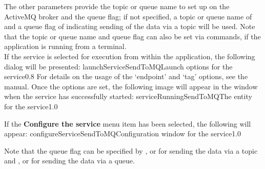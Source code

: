 The other parameters provide the topic or queue name to set up on the ActiveMQ broker and
the queue flag; if not specified, a topic or queue name of  and a queue flag
of  \longDash{} indicating sending of the data via a topic \longDash{} will be
used.
Note that the topic or queue name and queue flag can also be set via commands, if the
application is running from a terminal.\\

\insertStandardServiceCommands
\secondaryEnd
\condPage
{}
If the service is selected for execution from within the \emph{\MMMU} application, the
following dialog will be presented:
%
{launchServiceSendToMQ}{Launch options for the \emph{\SMO} service}{0.8}
\condPage{}
For details on the usage of the `endpoint' and `tag' options, see the \emph{\MMMU} manual.
Once the options are set, the following image will appear in the \emph{\MMMU} window when
the service has successfully started:
%
{serviceRunningSendToMQ}{The \emph{\MMMU} entity for the \emph{\SMO} service}{1.0}

If the \textbf{Configure the service} menu item has been selected, the following will
appear:
%
{configureServiceSendToMQ}{Configuration window for the \emph{\SMO} service}{1.0}

Note that the queue flag can be specified by ,  or
 for sending the data via a topic and ,  or
 for sending the data via a queue.
\secondaryEnd
\primaryEnd{}
